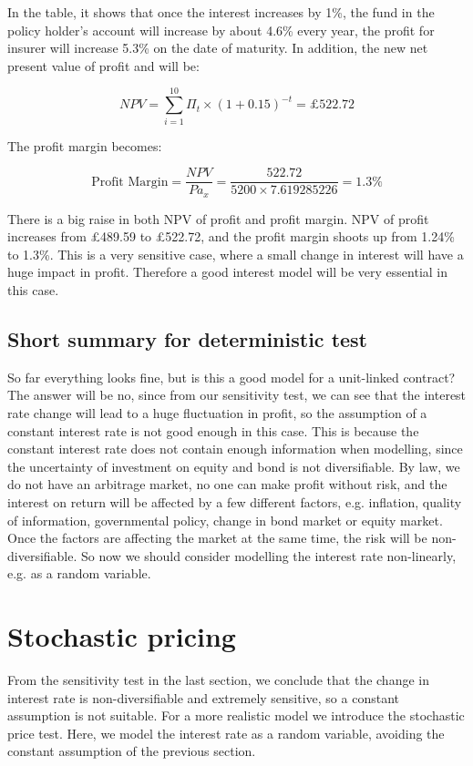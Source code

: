 \documentclass{report}
\begin{document}
In the table, it shows that once the interest increases by 1\%, the fund in the policy holder's account will increase by about 4.6\% every year, the profit for insurer will increase 5.3\% on the date of maturity. In addition, the new net present value of profit and will be:

\[
 NPV=\sum_{i=1}^{10} \Pi_t \times (1+0.15)^{-t} = \pounds522.72
\]
 
The profit margin becomes:


\[
\text{Profit Margin} =  \frac{NPV}{P \ddot{a}_x} = \frac{522.72}{5200 \times 7.619285226} = 1.3\%
\]

There is a big raise in both NPV of profit and profit margin. NPV of profit increases from \pounds489.59 to \pounds522.72, and the profit margin shoots up from 1.24\% to 1.3\%. This is a very sensitive case, where a small change in interest will have a huge impact in profit. Therefore a good interest model will be very essential in this case.
 





\subsection{Short summary for deterministic test}
So far everything looks fine, but is this a good model for a unit-linked contract? The answer will be no, since from our sensitivity test, we can see that the interest rate change will lead to a huge fluctuation in profit, so the assumption of a constant interest rate is not good enough in this case. This is because the constant interest rate does not contain  enough information when modelling, since the uncertainty of investment on equity and bond is not diversifiable. By law, we do not have an arbitrage market, no one can make profit without risk, and the interest on return will be affected by a few different factors, \cite{bib:riskfactor} e.g. inflation, quality of information, governmental policy, change in bond market or equity market. Once the factors  are affecting the market at the same time, the risk will be non-diversifiable. So now we should consider modelling the interest rate non-linearly, e.g. as a random variable. 




\section{Stochastic pricing}

From the sensitivity test in the last section, we conclude that the change in interest rate is non-diversifiable and extremely sensitive, so a constant assumption is not suitable. 
For a more realistic model we introduce the stochastic price test. Here, we model the interest rate as a random variable, avoiding the constant assumption of the previous section.
\end{document}
